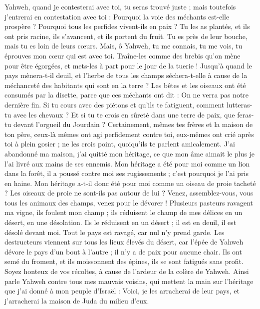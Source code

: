 \begin{multicols}{2}
\VerseOne{}Yahweh, quand je contesterai avec toi, tu seras trouvé juste ; mais toutefois j'entrerai en contestation avec toi : Pourquoi la voie des méchants est-elle prospère ? Pourquoi tous les perfides vivent-ils en paix ?
Tu les as plantés, et ils ont pris racine, ils s'avancent, et ils portent du fruit. Tu es près de leur bouche, mais tu es loin de leurs cœurs.
Mais, ô Yahweh, tu me connais, tu me vois, tu éprouves mon cœur qui est avec toi. Traîne-les comme des brebis qu'on mène pour être égorgées, et mets-les à part pour le jour de la tuerie !
Jusqu'à quand le pays mènera-t-il deuil, et l'herbe de tous les champs séchera-t-elle à cause de la méchanceté des habitants qui sont en la terre ? Les bêtes et les oiseaux ont été consumés par la disette, parce que ces méchants ont dit : On ne verra pas notre dernière fin. 
Si tu cours avec des piétons et qu'ils te fatiguent, comment lutteras-tu avec les chevaux ? Et si tu te crois en sûreté dans une terre de paix, que feras-tu devant l'orgueil du Jourdain ?
 Certainement, mêmes tes frères et la maison de ton père, ceux-là mêmes ont agi perfidement contre toi, eux-mêmes ont crié après toi à plein gosier ; ne les crois point, quoiqu'ils te parlent amicalement.
J'ai abandonné ma maison, j'ai quitté mon héritage, ce que mon âme aimait le plus je l'ai livré aux mains de ses ennemis.
Mon héritage a été pour moi comme un lion dans la forêt, il a poussé contre moi ses rugissements ; c'est pourquoi je l'ai pris en haine.
Mon héritage a-t-il donc été pour moi comme un oiseau de proie tacheté ? Les oiseaux de proie ne sont-ils pas autour de lui ? Venez, assemblez-vous, vous tous les animaux des champs, venez pour le dévorer !
Plusieurs pasteurs ravagent ma vigne, ils foulent mon champ ; ils réduisent le champ de mes délices en un désert, en une désolation.
Ils le réduisent en un désert ; il est en deuil, il est désolé devant moi. Tout le pays est ravagé, car nul n'y prend garde.
Les destructeurs viennent sur tous les lieux élevés du désert, car l'épée de Yahweh dévore le pays d'un bout à l'autre ; il n'y a de paix pour aucune chair.
Ils ont semé du froment, et ils moissonnent des épines, ils se sont fatigués sans profit. Soyez honteux de vos récoltes, à cause de l'ardeur de la colère de Yahweh.
Ainsi parle Yahweh contre tous mes mauvais voisins, qui mettent la main sur l'héritage que j'ai donné à mon peuple d'Israël : Voici, je les arracherai de leur pays, et j'arracherai la maison de Juda du milieu d'eux.

\end{multicols}
